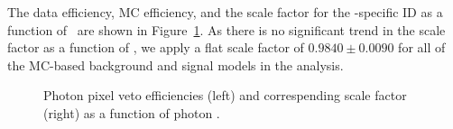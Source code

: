 The data efficiency, MC efficiency, and the scale factor for the \Pgg-specific ID as a function of \pt\ are shown in Figure~\ref{fig:pvsf_results}. 
As there is no significant trend in the scale factor as a function of \pt, we apply a flat scale factor of $0.9840 \pm 0.0090$ for all of the MC-based background and signal models in the analysis.

\begin{figure}[htbp]
  \centering
  \caption{
    Photon pixel veto efficiencies (left) and correspending scale factor (right) as a function of photon \pt.
  }
  \label{fig:pvsf_results}
\end{figure}
